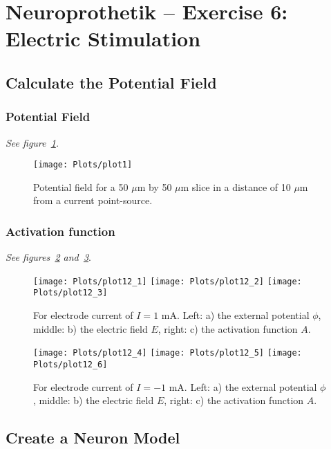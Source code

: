 \documentclass[
a4paper, 
12pt, 
]{article}
\begin{document}
	
	\thispagestyle{firstpage} 			%
	
	\section*{Neuroprothetik -- Exercise 6: Electric Stimulation}
	\subsection{Calculate the Potential Field}
	\subsubsection{Potential Field}
	\textit{See figure~\ref{fig:plot1_1}.}
	\begin{figure}[h]
\centering
\texttt{[image: Plots/plot1]}
\caption{Potential field for a 50 $\mu$m by 50 $\mu$m slice in a distance of 10 $\mu$m from a current point-source.}
\label{fig:plot1_1}
\end{figure}

\subsubsection{Activation function}
	\textit{See figures~\ref{fig:plot12_1} and~\ref{fig:plot12_2}}.
\begin{figure}[h]
\centering
\texttt{[image: Plots/plot12\_1]}
\texttt{[image: Plots/plot12\_2]}
\texttt{[image: Plots/plot12\_3]}
\caption{For electrode current of $I = 1$ mA. Left: a) the external potential $\phi$, middle: b) the electric field $E$, right: c) the activation function $A$.}
\label{fig:plot12_1}
\end{figure}

\begin{figure}[h!]
	\centering
	\texttt{[image: Plots/plot12\_4]}
	\texttt{[image: Plots/plot12\_5]}
	\texttt{[image: Plots/plot12\_6]}
	\caption{For electrode current of $I = -1$ mA. Left: a) the external potential $\phi$, middle: b) the electric field $E$, right: c) the activation function $A$.}
	\label{fig:plot12_2}
\end{figure}

\subsection{Create a Neuron Model}
\end{document}
